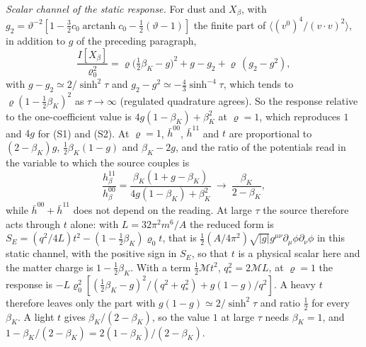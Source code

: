 \emph{Scalar channel of the static response.} For dust and \(X_\beta\), with \(g_2=\vartheta^{-2}[1-\tfrac32c_0\operatorname{arctanh}c_0-\tfrac12(\vartheta-1)]\) the finite part of \(\langle(v^0)^4/(v\cdot v)^2\rangle\), in addition to \(g\) of the preceding paragraph,
\[
\frac{I[X_\beta]}{\varrho_0^2}=\varrho\bigl(\tfrac12\beta_K-g\bigr)^2+g-g_2+\varrho\,(g_2-g^2),
\]
with \(g-g_2\simeq2/\sinh^2\tau\) and \(g_2-g^2\simeq-\tfrac43\sinh^{-4}\tau\), which tends to \(\varrho(1-\tfrac12\beta_K)^2\) as \(\tau\to\infty\) (regulated quadrature agrees). So the response relative to the one-coefficient value is \(4g(1-\beta_K)+\beta_K^2\) at \(\varrho=1\), which reproduces \(1\) and \(4g\) for (S1) and (S2). At \(\varrho=1\), \(\bar h^{00}\), \(\bar h^{11}\) and \(t\) are proportional to \((2-\beta_K)g\), \(\tfrac12\beta_K(1-g)\) and \(\beta_K-2g\), and the ratio of the potentials read in the variable to which the source couples is
\[
\frac{h_\beta^{11}}{h_\beta^{00}}=\frac{\beta_K(1+g-\beta_K)}{4g(1-\beta_K)+\beta_K^2}\ \longrightarrow\ \frac{\beta_K}{2-\beta_K},
\]
while \(\bar h^{00}+\bar h^{11}\) does not depend on the reading. At large \(\tau\) the source therefore acts through \(t\) alone: with \(L=32\pi^2m^6/A\) the reduced form is \(S_E=(q^2/4L)t^2-(1-\tfrac12\beta_K)\varrho_0t\), that is \(\tfrac12(A/4\pi^2)\sqrt{|g|}g^{\mu\nu}\partial_\mu\phi\partial_\nu\phi\) in this static channel, with the positive sign in \(S_E\), so that \(t\) is a physical scalar here and the matter charge is \(1-\tfrac12\beta_K\). With a term \(\tfrac12\mathcal Mt^2\), \(q_*^2=2\mathcal ML\), at \(\varrho=1\) the response is \(-L\varrho_0^2[(\tfrac12\beta_K-g)^2/(q^2+q_*^2)+g(1-g)/q^2]\). A heavy \(t\) therefore leaves only the part with \(g(1-g)\simeq2/\sinh^2\tau\) and ratio \(\tfrac12\) for every \(\beta_K\). A light \(t\) gives \(\beta_K/(2-\beta_K)\), so the value \(1\) at large \(\tau\) needs \(\beta_K=1\), and \(1-\beta_K/(2-\beta_K)=2(1-\beta_K)/(2-\beta_K)\).

